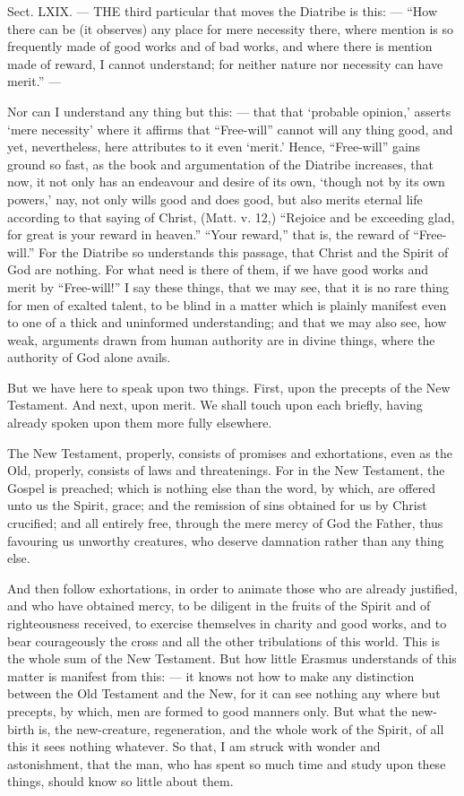 
Sect. LXIX. — THE third particular that moves the Diatribe is this: — “How there can be (it observes) any place for mere necessity there, where mention is so frequently made of good works and of bad works, and where there is mention made of reward, I cannot understand; for neither nature nor necessity can have merit.” —

Nor can I understand any thing but this: — that that ‘probable opinion,’ asserts ‘mere necessity’ where it affirms that “Free-will” cannot will any thing good, and yet, nevertheless, here attributes to it even ‘merit.’ Hence, “Free-will” gains ground so fast, as the book and argumentation of the Diatribe increases, that now, it not only has an endeavour and desire of its own, ‘though not by its own powers,’ nay, not only wills good and does good, but also merits eternal life according to that saying of Christ, (Matt. v. 12,) “Rejoice and be exceeding glad, for great is your reward in heaven.” “Your reward,” that is, the reward of “Free-will.” For the Diatribe so understands this passage, that Christ and the Spirit of God are nothing. For what need is there of them, if we have good works and merit by “Free-will!” I say these things, that we may see, that it is no rare thing for men of exalted talent, to be blind in a matter which is plainly manifest even to one of a thick and uninformed understanding; and that we may also see, how weak, arguments drawn from human authority are in divine things, where the authority of God alone avails.

But we have here to speak upon two things. First, upon the precepts of the New Testament. And next, upon merit. We shall touch upon each briefly, having already spoken upon them more fully elsewhere.

The New Testament, properly, consists of promises and exhortations, even as the Old, properly, consists of laws and threatenings. For in the New Testament, the Gospel is preached; which is nothing else than the word, by which, are offered unto us the Spirit, grace; and the remission of sins obtained for us by Christ crucified; and all entirely free, through the mere mercy of God the Father, thus favouring us unworthy creatures, who deserve damnation rather than any thing else.

And then follow exhortations, in order to animate those who are already justified, and who have obtained mercy, to be diligent in the fruits of the Spirit and of righteousness received, to exercise themselves in charity and good works, and to bear courageously the cross and all the other tribulations of this world. This is the whole sum of the New Testament. But how little Erasmus understands of this matter is manifest from this: — it knows not how to make any distinction between the Old Testament and the New, for it can see nothing any where but precepts, by which, men are formed to good manners only. But what the new-birth is, the new-creature, regeneration, and the whole work of the Spirit, of all this it sees nothing whatever. So that, I am struck with wonder and astonishment, that the man, who has spent so much time and study upon these things, should know so little about them.

